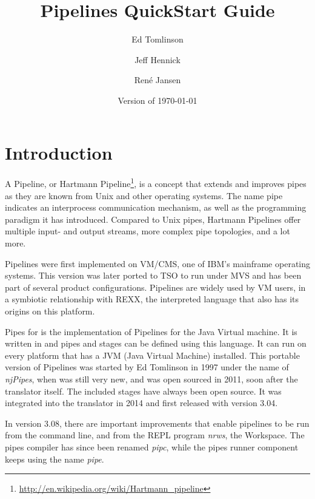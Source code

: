 

\renewcommand{\isbn}{978-90-819090-3-7}    
\setcounter{tocdepth}{1} 
\title{Pipelines QuickStart Guide}
\author{Ed Tomlinson \and Jeff Hennick \and René Jansen}
\date{Version  of \today}
\maketitle
{}
\pagestyle{plain}
\frontmatter
{}
\pagestyle{plain}

\tableofcontents
\newpage
{}
\frontmatter
\large


\mainmatter
\chapter{Introduction}
A Pipeline, or Hartmann Pipeline\footnote{\url{http://en.wikipedia.org/wiki/Hartmann_pipeline}}, is a concept that extends and improves pipes as they are known from Unix and other operating systems. The name pipe indicates an interprocess communication mechanism, as well as the programming paradigm it has introduced. Compared to Unix pipes, Hartmann Pipelines offer multiple input- and output streams, more complex pipe topologies, and a lot more.

Pipelines were first implemented on VM/CMS, one of IBM's mainframe
operating systems. This version was later ported to TSO to run under
MVS and has been part of several product configurations. Pipelines are
widely used by VM users, in a symbiotic relationship with REXX, the
interpreted language that also has its origins on this platform.

Pipes for \nr{} is the implementation of Pipelines for the Java Virtual
machine. It is written in \nr{} and pipes and stages can be defined using this
language. It can run on every platform that has a JVM
(Java Virtual Machine) installed. This portable version of Pipelines was started
by Ed Tomlinson in 1997 under the name of \emph{njPipes}, when \nr{} was
still very new, and was open sourced in 2011, soon after the \nr{}
translator itself. The included stages have always been open source. It was integrated into the \nr{} translator in
2014 and first released with version 3.04.

In version 3.08, there are
important improvements that enable pipelines to be run from the
command line, and from the \nr{} REPL program \emph{nrws}, the
\nr{} Workspace. The pipes compiler has since been renamed
\emph{pipc}, while the pipes runner component keeps using the name \emph{pipe}.

